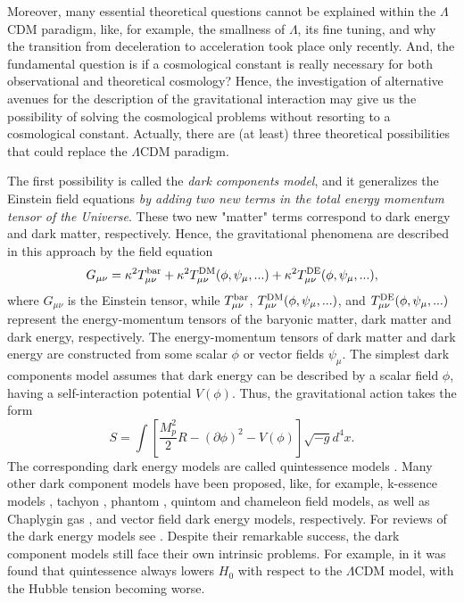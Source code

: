 \documentclass[aps,superscriptaddress, showpacs,preprintnumbers, superscriptaddress, nofootinbibt,twocolumn]{revtex4}
\def\be{\begin{equation}}
\def\ee{\end{equation}}
\begin{document}
Moreover,  many essential theoretical questions cannot be explained within the $\Lambda$CDM paradigm, like, for example, the smallness of $\Lambda$, its fine tuning, and why the transition from deceleration to acceleration took place only recently.  And, the fundamental question is if a cosmological constant is really necessary for both observational and theoretical cosmology?
Hence, the investigation of alternative avenues for the description of the gravitational interaction may give us the possibility of solving the cosmological problems without resorting to a cosmological constant. Actually, there are (at least) three theoretical possibilities that could replace  the $\Lambda$CDM paradigm.

The first possibility  is called the {\it dark components model}, and it generalizes the Einstein field equations {\it by adding two new terms in the total energy momentum tensor of the Universe}. These two new "matter" terms correspond to dark energy and dark matter, respectively. Hence, the gravitational phenomena are described in this approach by the field equation \cite{HL20}
\be
G_{\mu \nu}=\kappa ^2 T^{\rm bar}_{\mu \nu}+\kappa ^2T^{\rm DM}_{\mu \nu}(\phi, \psi _{\mu},...)+\kappa ^2T^{\rm DE}_{\mu \nu}(\phi, \psi _{\mu},...),
\ee
where $G_{\mu \nu}$ is the Einstein tensor, while $T^{\rm bar}_{\mu \nu}$, $T^{\rm DM}_{\mu \nu}(\phi, \psi_{\mu},...)$, and $T^{\rm DE}_{\mu \nu}(\phi, \psi_{\mu},...)$ represent the energy-momentum tensors of the baryonic matter, dark matter and dark energy, respectively.  The energy-momentum tensors of dark matter and dark energy are constructed from some scalar $\phi$ or vector fields $\psi _{\mu}$.  The simplest dark components model  assumes that dark energy can be described by a scalar field $\phi$, having a self-interaction potential $V(\phi)$. Thus, the gravitational action takes the form
\be
S=\int{\left[\frac{M_{p}^2}{2}R-\left(\partial \phi\right)^2-V(\phi)\right]\sqrt{-g}d^4x}.
\ee
The corresponding dark energy models are called quintessence models \cite{Qa1,Qa2,Qa3,Qa4,Qa5, Qa6}.  Many other dark component models have been proposed, like, for example,  k-essence models \cite{K1,K2,K3}, tachyon  \cite{T1,T2}, phantom \cite{Ph1,Ph2,Ph3},  quintom \cite{Qu1,Qu2,Qu3} and chameleon \cite{Ch1,Ch2,Ch3,nonlocal,Ch4} field models, as well as Chaplygin gas \cite{Cha1,Cha2}, and vector field \cite{V1,V2,V3} dark energy  models, respectively. For reviews of the dark energy models see \cite{Rev1,Rev2,Rev3,Rev4}.
Despite their remarkable success, the dark component models still face their own intrinsic problems. For example, in  \cite{Qa6} it was found that quintessence always lowers $H_0$ with respect to the $\Lambda$CDM model, with the Hubble tension becoming worse.
\end{document}
